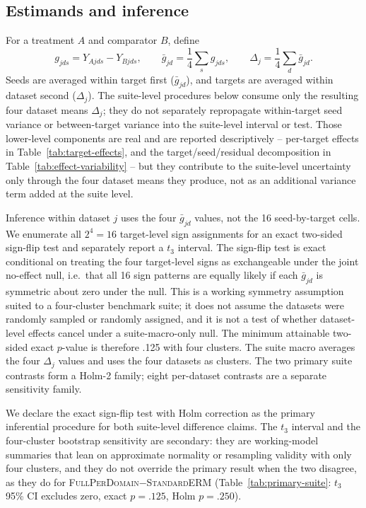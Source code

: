 \documentclass[10pt]{article}
\newcommand{\full}{\textsc{FullPerDomain}}
\newcommand{\erm}{\textsc{StandardERM}}
\begin{document}
\subsection{Estimands and inference}
\label{sec:estimands-inference}

For a treatment $A$ and comparator $B$, define
\begin{equation}
g_{jds}=Y_{Ajds}-Y_{Bjds},\qquad
\bar g_{jd}=\frac14\sum_sg_{jds},\qquad
\Delta_j=\frac14\sum_d\bar g_{jd}.
\end{equation}
Seeds are averaged within target first ($\bar g_{jd}$), and targets are
averaged within dataset second ($\Delta_j$). The suite-level procedures below
consume only the resulting four dataset means $\Delta_j$; they do not
separately repropagate within-target seed variance or between-target
variance into the suite-level interval or test. Those lower-level components
are real and are reported descriptively -- per-target effects in
Table~\ref{tab:target-effects}, and the target/seed/residual decomposition in
Table~\ref{tab:effect-variability} -- but they contribute to the suite-level
uncertainty only through the four dataset means they produce, not as an
additional variance term added at the suite level.

Inference within dataset $j$ uses the four $\bar g_{jd}$ values, not the 16
seed-by-target cells. We enumerate all $2^4=16$ target-level sign
assignments for an exact two-sided sign-flip test and separately report a
$t_3$ interval. The sign-flip test is exact conditional on treating the four
target-level signs as exchangeable under the joint no-effect null, i.e.\ that
all 16 sign patterns are equally likely if each $\bar g_{jd}$ is symmetric
about zero under the null. This is a working symmetry assumption suited to a
four-cluster benchmark suite; it does not assume the datasets were randomly
sampled or randomly assigned, and it is not a test of whether dataset-level
effects cancel under a suite-macro-only null. The minimum attainable
two-sided exact $p$-value is therefore .125 with four clusters. The suite
macro averages the four $\Delta_j$ values and uses the four datasets as
clusters. The two primary suite contrasts form a Holm-2 family; eight
per-dataset contrasts are a separate sensitivity family.

We declare the exact sign-flip test with Holm correction as the primary
inferential procedure for both suite-level difference claims. The $t_3$
interval and the four-cluster bootstrap sensitivity are secondary: they are
working-model summaries that lean on approximate normality or resampling
validity with only four clusters, and they do not override the primary
result when the two disagree, as they do for \full{}$-$\erm{}
(Table~\ref{tab:primary-suite}: $t_3$ 95\% CI excludes zero, exact $p=.125$,
Holm $p=.250$).
\end{document}
